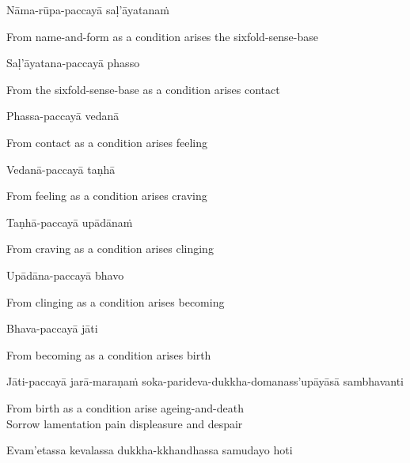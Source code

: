 Nāma-rūpa-paccayā saḷ'āyatanaṁ

\begin{english}
  From name-and-form as a condition arises the sixfold-sense-base
\end{english}

Saḷ'āyatana-paccayā phasso

\ifafiveversion\clearpage\fi

\begin{english}
  From the sixfold-sense-base as a condition arises contact
\end{english}

\ifbfiveversion\clearpage\fi

Phassa-paccayā vedanā

\begin{english}
  From contact as a condition arises feeling
\end{english}

Vedanā-paccayā taṇhā

\begin{english}
  From feeling as a condition arises craving
\end{english}

Taṇhā-paccayā upādānaṁ

\begin{english}
  From craving as a condition arises clinging
\end{english}

Upādāna-paccayā bhavo

\begin{english}
  From clinging as a condition arises becoming
\end{english}

Bhava-paccayā jāti

\begin{english}
  From becoming as a condition arises birth
\end{english}

\begin{pali-hang}
  Jāti-paccayā jarā-maraṇaṁ soka-parideva-dukkha-domanass'upāyāsā sambhavanti
\end{pali-hang}

\begin{english}
  From birth as a condition arise ageing-and-death\\
  Sorrow lamentation pain displeasure and despair
\end{english}

Evam'etassa kevalassa dukkha-kkhandhassa samudayo hoti

